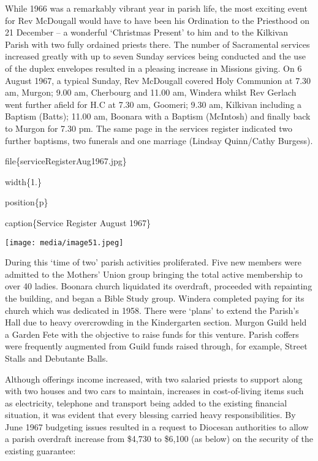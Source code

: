 While 1966 was a remarkably vibrant year in parish life, the most exciting event for Rev McDougall would have to have been his Ordination to the Priesthood on 21 December -- a wonderful `Christmas Present' to him and to the Kilkivan Parish with two fully ordained priests there. The number of Sacramental services increased greatly with up to seven Sunday services being conducted and the use of the duplex envelopes resulted in a pleasing increase in Missions giving. On 6 August 1967, a typical Sunday, Rev McDougall covered Holy Communion at 7.30 am, Murgon; 9.00 am, Cherbourg and 11.00 am, Windera whilst Rev Gerlach went further afield for H.C at 7.30 am, Goomeri; 9.30 am, Kilkivan including a Baptism (Batts); 11.00 am, Boonara with a Baptism (McIntosh) and finally back to Murgon for 7.30 pm. The same page in the services register indicated two further baptisms, two funerals and one marriage (Lindsay Quinn/Cathy Burgess).

file\{serviceRegisterAug1967.jpg\}

width\{1.\}

position\{p\}

caption\{Service Register August 1967\}

\texttt{[image: media/image51.jpeg]}

During this `time of two' parish activities proliferated. Five new members were admitted to the Mothers' Union group bringing the total active membership to over 40 ladies. Boonara church liquidated its overdraft, proceeded with repainting the building, and began a Bible Study group. Windera completed paying for its church which was dedicated in 1958. There were `plans' to extend the Parish's Hall due to heavy overcrowding in the Kindergarten section. Murgon Guild held a Garden Fete with the objective to raise funds for this venture. Parish coffers were frequently augmented from Guild funds raised through, for example, Street Stalls and Debutante Balls.

Although offerings income increased, with two salaried priests to support along with two houses and two cars to maintain, increases in cost-of-living items such as electricity, telephone and transport being added to the existing financial situation, it was evident that every blessing carried heavy responsibilities. By June 1967 budgeting issues resulted in a request to Diocesan authorities to allow a parish overdraft increase from \$4,730 to \$6,100 (as below) on the security of the existing guarantee:

